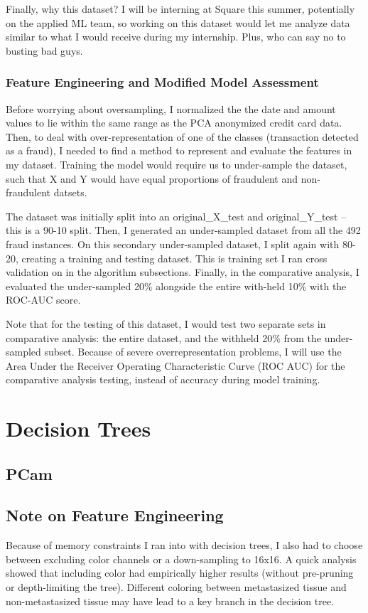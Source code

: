 \documentclass[a4paper]{article}
\begin{document}
Finally, why this dataset? I will be interning at Square this summer, potentially on the applied ML team, so working on this dataset would let me analyze data similar to what I would receive during my internship. Plus, who can say no to busting bad guys.

\subsubsection{Feature Engineering and Modified Model Assessment}
Before worrying about oversampling, I normalized the the date and amount values to lie within the same range as the PCA anonymized credit card data. Then, to deal with over-representation of one of the classes (transaction detected as a fraud), I needed to find a method to represent and evaluate the features in my dataset. Training the model would require us to under-sample the dataset, such that X and Y would have equal proportions of fraudulent and non-fraudulent datsets. 

The dataset was initially split into an original\_X\_test and original\_Y\_test -- this is a 90-10 split. Then, I generated an under-sampled dataset from all the 492 fraud instances. On this secondary under-sampled dataset, I split again with 80-20, creating a training and testing dataset. This is training set I ran cross validation on in the algorithm subsections. Finally, in the comparative analysis, I evaluated the under-sampled 20\% alongside the entire with-held 10\% with the ROC-AUC score.

Note that for the testing of this dataset, I would test two separate sets in comparative analysis: the entire dataset, and the withheld 20\% from the under-sampled subset. Because of severe overrepresentation problems, I will use the Area Under the Receiver Operating Characteristic Curve (ROC AUC) for the comparative analysis testing, instead of accuracy during model training.

\section{Decision Trees}
\subsection{PCam}

\subsection{Note on Feature Engineering}
Because of memory constraints I ran into with decision trees, I also had to choose between excluding color channels or a down-sampling to 16x16. A quick analysis showed that including color had empirically higher results (without pre-pruning or depth-limiting the tree). Different coloring between metastasized tissue and non-metastasized tissue may have lead to a key branch in the decision tree. 
\end{document}
